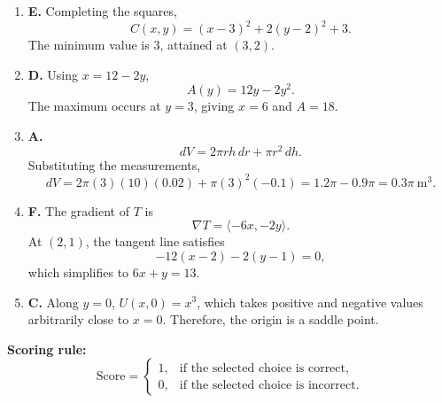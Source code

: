 \documentclass[a4paper,12pt]{article}
\theoremstyle{mystyle}
\numberwithin{equation}{section}
\numberwithin{theorem}{section}
\numberwithin{proposition}{section}
\numberwithin{example}{section}
\numberwithin{remark}{section}
\numberwithin{lemma}{section}
\numberwithin{corollary}{section}
\numberwithin{definition}{section}
\begin{document}
\begin{enumerate}[label=\textbf{Question \arabic*.},leftmargin=*]
\item \textbf{E.}
Completing the squares,
\[
C(x,y)=(x-3)^2+2(y-2)^2+3.
\]
The minimum value is \(3\), attained at \((3,2)\).

\item \textbf{D.}
Using \(x=12-2y\),
\[
A(y)=12y-2y^2.
\]
The maximum occurs at \(y=3\), giving \(x=6\) and \(A=18\).

\item \textbf{A.}
\[
dV=2\pi rh\,dr+\pi r^2\,dh.
\]
Substituting the measurements,
\[
dV=2\pi(3)(10)(0.02)+\pi(3)^2(-0.1)
=1.2\pi-0.9\pi=0.3\pi\ \mathrm{m}^3.
\]

\item \textbf{F.}
The gradient of \(T\) is
\[
\nabla T=\langle-6x,-2y\rangle.
\]
At \((2,1)\), the tangent line satisfies
\[
-12(x-2)-2(y-1)=0,
\]
which simplifies to \(6x+y=13\).

\item \textbf{C.}
Along \(y=0\), \(U(x,0)=x^3\), which takes positive and negative
values arbitrarily close to \(x=0\). Therefore, the origin is a
saddle point.

\end{enumerate}


\noindent
\textbf{Scoring rule:}
\[
\text{Score}=
\begin{cases}
1, & \text{if the selected choice is correct},\\
0, & \text{if the selected choice is incorrect}.
\end{cases}
\]

\printbibliography
\end{document}
